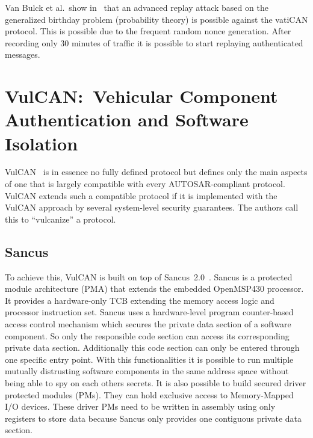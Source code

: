 Van Bulck et al.\ show in~\cite{VanBulck2017} that an advanced replay attack
based on the generalized birthday problem (probability theory) is possible
against the vatiCAN protocol. This is possible due to the frequent random nonce
generation. After recording only 30 minutes of traffic it is possible to start
replaying authenticated messages.


\section{VulCAN:\ Vehicular Component Authentication and Software Isolation}\label{sec:vulcan}

VulCAN~\cite{VanBulck2017} is in essence no fully defined protocol but defines
only the main aspects of one that is largely compatible with every
AUTOSAR-compliant protocol. VulCAN extends such a compatible protocol if it is
implemented with the VulCAN approach by several system-level security
guarantees. The authors call this to ``vulcanize'' a protocol.

\subsection{Sancus}\label{subsec:sancus}

To achieve this, VulCAN is built on top of Sancus~2.0~\cite{Noorman}. Sancus is
a protected module architecture (PMA) that extends the embedded OpenMSP430
processor. It provides a hardware-only TCB extending the memory access logic and
processor instruction set. Sancus uses a hardware-level program counter-based
access control mechanism which secures the private data section of a software
component. So only the responsible code section can access its corresponding
private data section. Additionally this code section can only be entered through
one specific entry point. With this functionalities it is possible to run
multiple mutually distrusting software components in the same address space
without being able to spy on each others secrets. It is also possible to build
secured driver protected modules (PMs). They can hold exclusive access to
Memory-Mapped I/O devices. These driver PMs need to be written in assembly using
only registers to store data because Sancus only provides one contiguous private
data section. 

